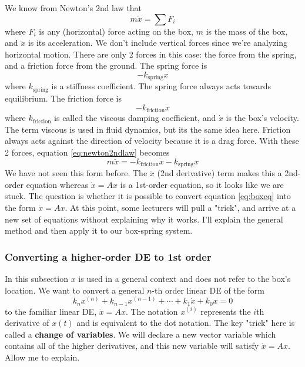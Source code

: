 \documentclass[11pt, oneside]{article}   	%
\begin{document}
We know from Newton's 2nd law that
\begin{equation} \label{eq:newton2ndlaw}
m \ddot{x} = \sum F_i
\end{equation}
where $F_i$ is any (horizontal) force acting on the box, $m$ is the mass of the box, and $\ddot{x}$ is its acceleration.
We don't include vertical forces since we're analyzing horizontal motion.
There are only 2 forces in this case: the force from the spring, and a friction force from the ground.
The spring force is
\begin{equation}
-k_\mathrm{spring} x
\end{equation}
where $k_\mathrm{spring}$ is a stiffness coefficient.
The spring force always acts towards equilibrium.
The friction force is
\begin{equation}
-k_\mathrm{friction} \dot{x}
\end{equation}
where $k_\mathrm{friction}$ is called the viscous damping coefficient, and $\dot{x}$ is the box's velocity.
The term viscous is used in fluid dynamics, but its the same idea here.
Friction always acts against the direction of velocity because it is a drag force.
With these 2 forces, equation \ref{eq:newton2ndlaw} becomes
\begin{equation} \label{eq:boxeq}
m \ddot{x} =
-k_\mathrm{friction} \dot{x}
-k_\mathrm{spring} x
\end{equation}
We have not seen this form before.
The $\ddot{x}$ (2nd derivative) term makes this a 2nd-order equation whereas $\dot{x} = Ax$ is a 1st-order equation, so it looks like we are stuck.
The question is whether it is possible to convert equation \ref{eq:boxeq} into the form $\dot{x} = Ax$.
At this point, some lecturers will pull a "trick", and arrive at a new set of equations without explaining why it works.
I'll explain the general method and then apply it to our box-spring system.

\subsubsection*{Converting a higher-order DE to 1st order}

In this subsection $x$ is used in a general context and does not refer to the box's location.
We want to convert a general $n$-th order linear DE of the form
\begin{equation} \label{eq:nthOrderDE}
k_n x^{(n)}
+ k_{n-1} x^{(n-1)}
+ \cdots
+ k_{1} \dot{x}
+ k_{0} x
= 0
\end{equation}
to the familiar linear DE, $\dot{x} = Ax$.
The notation $x^{(i)}$ represents the $i$th derivative of $x(t)$ and is equivalent to the dot notation.
The key "trick" here is called a \textbf{change of variables}.
We will declare a new vector variable which contains all of the higher derivatives,
and this new variable will satisfy $\dot{x} = Ax$.
Allow me to explain.
\end{document}
